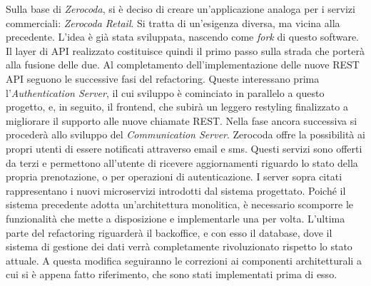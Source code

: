 \documentclass[a4paper,11pt]{article}
\begin{document}
	Sulla base di \emph{Zerocoda}, si è deciso di creare un’applicazione analoga per i servizi commerciali: \emph{Zerocoda Retail}. Si tratta di un’esigenza diversa, ma vicina alla precedente. L’idea è già stata sviluppata, nascendo come \emph{fork} di questo software. Il layer di API realizzato costituisce quindi il primo passo sulla strada che porterà alla fusione delle due. Al completamento dell'implementazione delle nuove REST API seguono le successive fasi del refactoring. Queste interessano prima l'\textit{Authentication Server}, il cui sviluppo è cominciato in parallelo a questo progetto, e, in seguito, il frontend, che subirà un leggero restyling finalizzato a migliorare il supporto alle nuove chiamate REST. Nella fase ancora successiva si procederà allo sviluppo del \textit{Communication Server}. Zerocoda offre la possibilità ai propri utenti di essere notificati attraverso email e sms. Questi servizi sono offerti da terzi e permettono all'utente di ricevere aggiornamenti riguardo lo stato della propria prenotazione, o per operazioni di autenticazione. I server sopra citati rappresentano i nuovi microservizi introdotti dal sistema progettato. Poiché il sistema precedente adotta un'architettura monolitica, è necessario scomporre le funzionalità che mette a disposizione e implementarle una per volta. L'ultima parte del refactoring riguarderà il backoffice, e con esso il database, dove il sistema di gestione dei dati verrà completamente rivoluzionato rispetto lo stato attuale. A questa modifica seguiranno le correzioni ai componenti architetturali a cui si è appena fatto riferimento, che sono stati implementati prima di esso. 

   	
\end{document}
